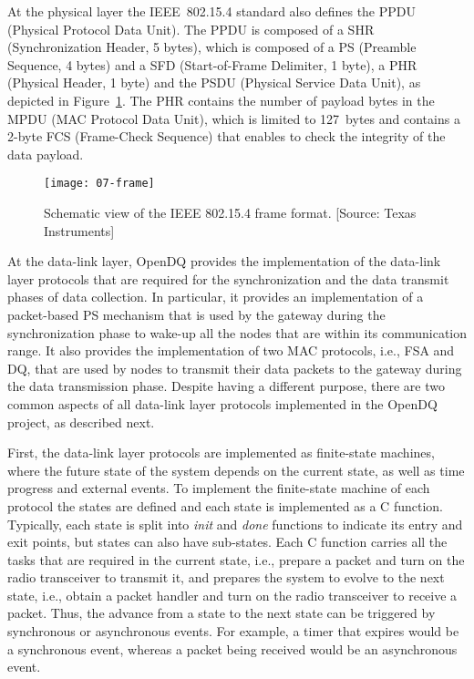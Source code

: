 At the physical layer the IEEE~802.15.4 standard also defines the PPDU (Physical Protocol Data Unit). The PPDU is composed of a SHR (Synchronization Header, 5 bytes), which is composed of a PS (Preamble Sequence, 4 bytes) and a SFD (Start-of-Frame Delimiter, 1 byte), a PHR (Physical Header, 1 byte) and the PSDU (Physical Service Data Unit), as depicted in Figure~\ref{fig:07-frame}. The PHR contains the number of payload bytes in the MPDU (MAC Protocol Data Unit), which is limited to 127~bytes and contains a 2-byte FCS (Frame-Check Sequence) that enables to check the integrity of the data payload.

\begin{figure}[!it]
    \centering
	\texttt{[image: 07-frame]}
    \caption[Schematic view of the IEEE 802.15.4 frame format]{Schematic view of the IEEE 802.15.4 frame format. [Source: Texas Instruments]}
    \label{fig:07-frame}
\end{figure}

At the data-link layer, OpenDQ provides the implementation of the data-link layer protocols that are required for the synchronization and the data transmit phases of data collection. In particular, it provides an implementation of a packet-based PS mechanism that is used by the gateway during the synchronization phase to wake-up all the nodes that are within its communication range. It also provides the implementation of two MAC protocols, i.e., FSA and DQ, that are used by nodes to transmit their data packets to the gateway during the data transmission phase. Despite having a different purpose, there are two common aspects of all data-link layer protocols implemented in the OpenDQ project, as described next.

First, the data-link layer protocols are implemented as finite-state machines, where the future state of the system depends on the current state, as well as time progress and external events. To implement the finite-state machine of each protocol the states are defined and each state is implemented as a C function. Typically, each state is split into \textit{init} and \textit{done} functions to indicate its entry and exit points, but states can also have sub-states. Each C function carries all the tasks that are required in the current state, i.e., prepare a packet and turn on the radio transceiver to transmit it, and prepares the system to evolve to the next state, i.e., obtain a packet handler and turn on the radio transceiver to receive a packet. Thus, the advance from a state to the next state can be triggered by synchronous or asynchronous events. For example, a timer that expires would be a synchronous event, whereas a packet being received would be an asynchronous event.

